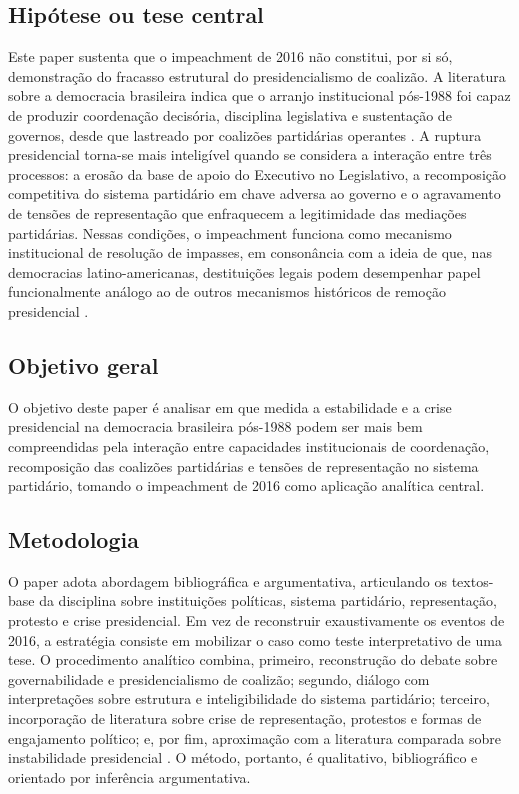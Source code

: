 \documentclass[12pt,a4paper]{article}
\begin{document}
\subsection{Hipótese ou tese central}
\label{sec:org90fb0aa}
Este paper sustenta que o impeachment de 2016 não constitui, por si só, demonstração do fracasso estrutural do presidencialismo de coalizão. A literatura sobre a democracia brasileira indica que o arranjo institucional pós-1988 foi capaz de produzir coordenação decisória, disciplina legislativa e sustentação de governos, desde que lastreado por coalizões partidárias operantes \textcite{palermo2000_como_se} \textcite{limongi2017_a_crise}. A ruptura presidencial torna-se mais inteligível quando se considera a interação entre três processos: a erosão da base de apoio do Executivo no Legislativo, a recomposição competitiva do sistema partidário em chave adversa ao governo e o agravamento de tensões de representação que enfraquecem a legitimidade das mediações partidárias. Nessas condições, o impeachment funciona como mecanismo institucional de resolução de impasses, em consonância com a ideia de que, nas democracias latino-americanas, destituições legais podem desempenhar papel funcionalmente análogo ao de outros mecanismos históricos de remoção presidencial \textcite{perez_lian2016_explaining_military}.

\subsection{Objetivo geral}
\label{sec:org986bc2e}
O objetivo deste paper é analisar em que medida a estabilidade e a crise presidencial na democracia brasileira pós-1988 podem ser mais bem compreendidas pela interação entre capacidades institucionais de coordenação, recomposição das coalizões partidárias e tensões de representação no sistema partidário, tomando o impeachment de 2016 como aplicação analítica central.

\subsection{Metodologia}
\label{sec:org85222d8}
O paper adota abordagem bibliográfica e argumentativa, articulando os textos-base da disciplina sobre instituições políticas, sistema partidário, representação, protesto e crise presidencial. Em vez de reconstruir exaustivamente os eventos de 2016, a estratégia consiste em mobilizar o caso como teste interpretativo de uma tese. O procedimento analítico combina, primeiro, reconstrução do debate sobre governabilidade e presidencialismo de coalizão; segundo, diálogo com interpretações sobre estrutura e inteligibilidade do sistema partidário; terceiro, incorporação de literatura sobre crise de representação, protestos e formas de engajamento político; e, por fim, aproximação com a literatura comparada sobre instabilidade presidencial \textcite{alonso2016_changing_repertoires} \textcite{singersd_tres_partidos} \textcite{alves2024_rage_within} \textcite{perez_lian2016_explaining_military}. O método, portanto, é qualitativo, bibliográfico e orientado por inferência argumentativa.
\end{document}
